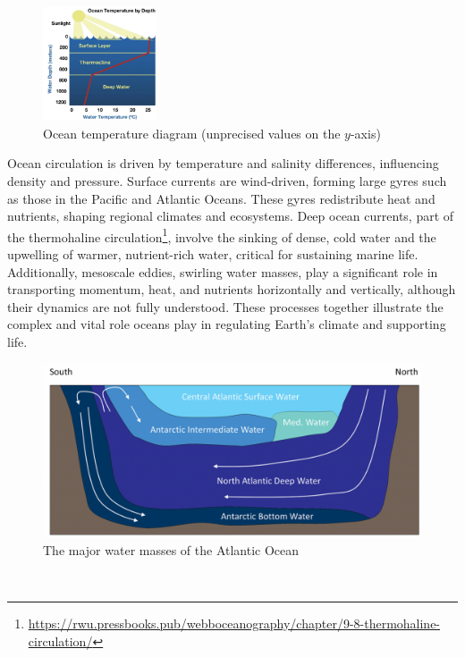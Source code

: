 \begin{figure}
	\begin{center}
		\includegraphics[width=0.3\textwidth]{upload/Ocean T.png}
	\end{center}
	\caption{Ocean temperature diagram (unprecised values on the $y$-axis)}
	\label{}
\end{figure}



Ocean circulation is driven by temperature and salinity differences, influencing density and pressure. Surface currents are wind-driven, forming large gyres such as those in the Pacific and Atlantic Oceans. These gyres redistribute heat and nutrients, shaping regional climates and ecosystems. Deep ocean currents, part of the thermohaline circulation\footnote{\url{https://rwu.pressbooks.pub/webboceanography/chapter/9-8-thermohaline-circulation/}}, involve the sinking of dense, cold water and the upwelling of warmer, nutrient-rich water, critical for sustaining marine life.
Additionally, mesoscale eddies, swirling water masses, play a significant role in transporting momentum, heat, and nutrients horizontally and vertically, although their dynamics are not fully understood. These processes together illustrate the complex and vital role oceans play in regulating Earth's climate and supporting life.
\begin{figure}[htbp]
	\centering
	\includegraphics[width=0.5\linewidth]{upload/atlocean.png}
	\caption{The major water masses of the Atlantic Ocean}
	\label{fig:enter-label}
\end{figure}
\\
[0.1cm]

